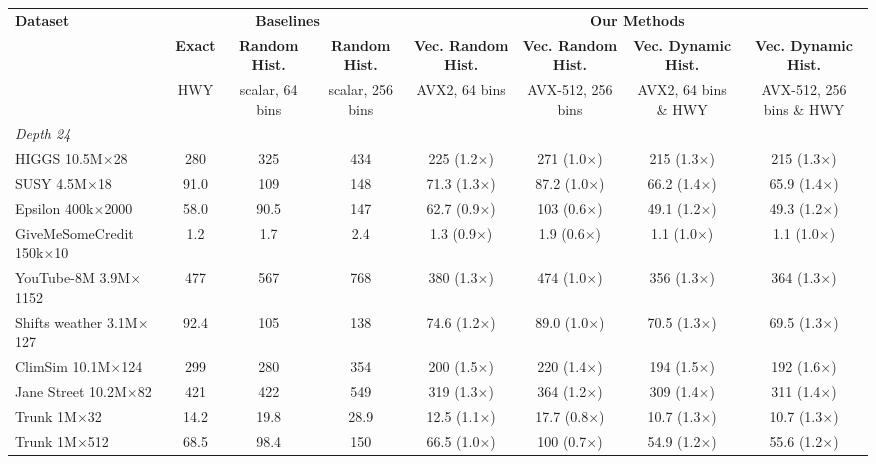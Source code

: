 \begin{table}[p]
    \centering
    \ContinuedFloat
    \footnotesize
    \setlength{\tabcolsep}{2.5pt}
    \begin{tabular}{l|ccc|cccc}
        \hline
        \multirow{3}{*}{\textbf{Dataset}} & \multicolumn{3}{c|}{\textbf{Baselines}} & \multicolumn{4}{c}{\textbf{Our Methods}} \\
         & \textbf{Exact} & \textbf{Random Hist.} & \textbf{Random Hist.} & \textbf{Vec. Random Hist.} & \textbf{Vec. Random Hist.} & \textbf{Vec. Dynamic Hist.} & \textbf{Vec. Dynamic Hist.} \\
         & \scriptsize HWY & \scriptsize scalar, 64 bins & \scriptsize scalar, 256 bins & \scriptsize AVX2, 64 bins & \scriptsize AVX-512, 256 bins & \scriptsize AVX2, 64 bins \& HWY & \scriptsize AVX-512, 256 bins \& HWY \\
        \hline
        \multicolumn{8}{l}{\textit{Depth 24}} \\
        HIGGS 10.5M$\times$28 & 280 & 325 & 434 & 225 (1.2$\times$) & 271 (1.0$\times$) & 215 (1.3$\times$) & 215 (1.3$\times$) \\
        SUSY 4.5M$\times$18 & 91.0 & 109 & 148 & 71.3 (1.3$\times$) & 87.2 (1.0$\times$) & 66.2 (1.4$\times$) & 65.9 (1.4$\times$) \\
        Epsilon 400k$\times$2000 & 58.0 & 90.5 & 147 & 62.7 (0.9$\times$) & 103 (0.6$\times$) & 49.1 (1.2$\times$) & 49.3 (1.2$\times$) \\
        GiveMeSomeCredit 150k$\times$10 & 1.2 & 1.7 & 2.4 & 1.3 (0.9$\times$) & 1.9 (0.6$\times$) & 1.1 (1.0$\times$) & 1.1 (1.0$\times$) \\
        YouTube-8M 3.9M$\times$1152 & 477 & 567 & 768 & 380 (1.3$\times$) & 474 (1.0$\times$) & 356 (1.3$\times$) & 364 (1.3$\times$) \\
        Shifts weather 3.1M$\times$127 & 92.4 & 105 & 138 & 74.6 (1.2$\times$) & 89.0 (1.0$\times$) & 70.5 (1.3$\times$) & 69.5 (1.3$\times$) \\
        ClimSim 10.1M$\times$124 & 299 & 280 & 354 & 200 (1.5$\times$) & 220 (1.4$\times$) & 194 (1.5$\times$) & 192 (1.6$\times$) \\
        Jane Street 10.2M$\times$82 & 421 & 422 & 549 & 319 (1.3$\times$) & 364 (1.2$\times$) & 309 (1.4$\times$) & 311 (1.4$\times$) \\
        Trunk 1M$\times$32 & 14.2 & 19.8 & 28.9 & 12.5 (1.1$\times$) & 17.7 (0.8$\times$) & 10.7 (1.3$\times$) & 10.7 (1.3$\times$) \\
        Trunk 1M$\times$512 & 68.5 & 98.4 & 150 & 66.5 (1.0$\times$) & 100 (0.7$\times$) & 54.9 (1.2$\times$) & 55.6 (1.2$\times$) \\

\end{tabular}
\end{table}
